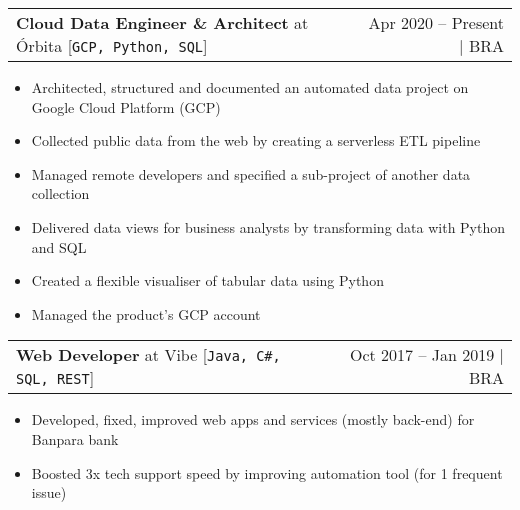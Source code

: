 \documentclass[a4paper,11pt]{article}
\makeatletter
\newcommand{\myHrefIcn}[2]{#2 \href{#1}{\scriptsize{\faExternalLink{}}}}
\newcommand{\resumeItemCustom}[1]{
  \item\small{#1 \vspace{-2pt}}
}
\newcommand{\resumeJobSubheadingD}[7]{
  \vspace{0pt}\item
    \begin{tabular*}{0.97\textwidth}{l@{\extracolsep{\fill}}r}
      \textbf{#4} at \myHrefIcn{#1}{#2} \hspace{3pt} [\small \texttt{#6}] & {\small #5}
    \end{tabular*}\vspace{-6pt}
}
\newcommand{\resumeItemListStart}{\begin{itemize}}
\newcommand{\resumeItemListEnd}{\end{itemize}\vspace{-5pt}}
\newcommand{\csharp}{C\#}
\makeatother
\begin{document}
    \resumeJobSubheadingD
      {http://orbita.srv.br/}{Órbita}{}%
      {Cloud Data Engineer \& Architect}{Apr 2020 -- Present $\vert$ BRA}
      {GCP, Python, SQL}%
      {Data platform creation, automated data integration}
      \resumeItemListStart
        \resumeItemCustom{Architected, structured and documented an automated data project on Google Cloud Platform (GCP)}
        \resumeItemCustom{Collected public data from the web by creating a serverless ETL pipeline}
        \resumeItemCustom{Managed remote developers and specified a sub-project of another data collection}
        \resumeItemCustom{Delivered data views for business analysts by transforming data with Python and SQL}
        \resumeItemCustom{Created a flexible visualiser of tabular data using Python}
        \resumeItemCustom{Managed the product's GCP account}
      \resumeItemListEnd
      
    \resumeJobSubheadingD
      {http://www.vibedesenv.com/}{Vibe}{Technology for businesses}%
      {Web Developer}{Oct 2017 -- Jan 2019 $\vert$ BRA}
      {Java, \csharp, SQL, REST}%
      {Internet banking web apps, management systems, web services for a state bank \myHrefIcn{http://www.banpara.b.br/}{Banpara}}
      \resumeItemListStart
        \resumeItemCustom{Developed, fixed, improved web apps and services (mostly back-end) for Banpara bank}
        \resumeItemCustom{Boosted 3x tech support speed by improving automation tool (for 1 frequent issue)}
      \resumeItemListEnd
\end{document}
